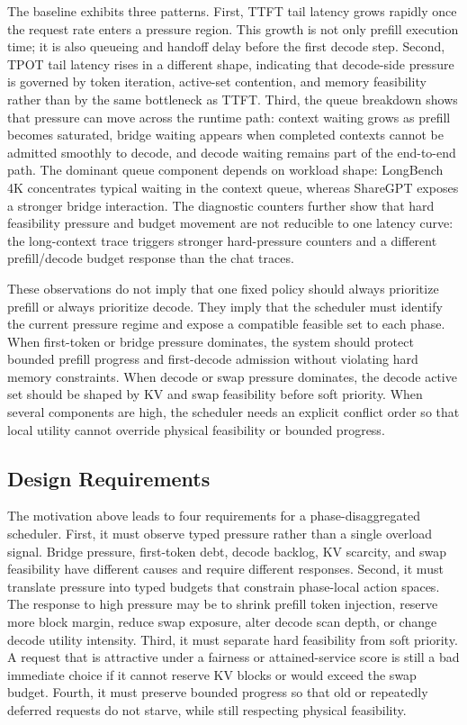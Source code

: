 \documentclass[lettersize,journal]{IEEEtran}
\begin{document}
The baseline exhibits three patterns. First, TTFT tail latency grows rapidly once the request rate enters a pressure region. This growth is not only prefill execution time; it is also queueing and handoff delay before the first decode step. Second, TPOT tail latency rises in a different shape, indicating that decode-side pressure is governed by token iteration, active-set contention, and memory feasibility rather than by the same bottleneck as TTFT. Third, the queue breakdown shows that pressure can move across the runtime path: context waiting grows as prefill becomes saturated, bridge waiting appears when completed contexts cannot be admitted smoothly to decode, and decode waiting remains part of the end-to-end path. The dominant queue component depends on workload shape: LongBench 4K concentrates typical waiting in the context queue, whereas ShareGPT exposes a stronger bridge interaction. The diagnostic counters further show that hard feasibility pressure and budget movement are not reducible to one latency curve: the long-context trace triggers stronger hard-pressure counters and a different prefill/decode budget response than the chat traces.

These observations do not imply that one fixed policy should always prioritize prefill or always prioritize decode. They imply that the scheduler must identify the current pressure regime and expose a compatible feasible set to each phase. When first-token or bridge pressure dominates, the system should protect bounded prefill progress and first-decode admission without violating hard memory constraints. When decode or swap pressure dominates, the decode active set should be shaped by KV and swap feasibility before soft priority. When several components are high, the scheduler needs an explicit conflict order so that local utility cannot override physical feasibility or bounded progress.

\subsection{Design Requirements}

The motivation above leads to four requirements for a phase-disaggregated scheduler. First, it must observe typed pressure rather than a single overload signal. Bridge pressure, first-token debt, decode backlog, KV scarcity, and swap feasibility have different causes and require different responses. Second, it must translate pressure into typed budgets that constrain phase-local action spaces. The response to high pressure may be to shrink prefill token injection, reserve more block margin, reduce swap exposure, alter decode scan depth, or change decode utility intensity. Third, it must separate hard feasibility from soft priority. A request that is attractive under a fairness or attained-service score is still a bad immediate choice if it cannot reserve KV blocks or would exceed the swap budget. Fourth, it must preserve bounded progress so that old or repeatedly deferred requests do not starve, while still respecting physical feasibility.
\end{document}
